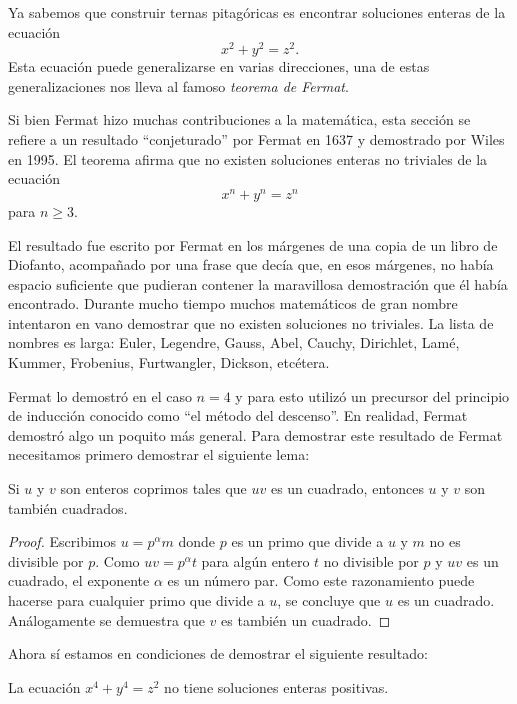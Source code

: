 Ya sabemos que construir ternas pitagóricas es encontrar
soluciones enteras de la ecuación 
\[
	x^2+y^2=z^2.
\]
Esta ecuación puede generalizarse en varias direcciones, una de estas
generalizaciones nos lleva al famoso \emph{teorema de Fermat}.  

Si bien Fermat
hizo muchas contribuciones a la matemática, esta sección se refiere a un
resultado ``conjeturado'' por Fermat en 1637 y demostrado por Wiles en 1995. El
teorema afirma que no existen soluciones enteras no triviales de la ecuación
\[
	x^n+y^n=z^n
\]
para $n\geq3$. 

El resultado fue escrito por Fermat en los márgenes de una copia de un libro de
Diofanto, acompañado por una frase que decía que, en esos márgenes, no había
espacio suficiente que pudieran contener la maravillosa demostración que él
había encontrado.  Durante mucho tiempo muchos matemáticos de gran nombre
intentaron en vano demostrar que no existen soluciones no triviales. La lista
de nombres es larga: Euler, Legendre, Gauss, Abel, Cauchy, Dirichlet, Lamé,
Kummer, Frobenius, Furtwangler, Dickson, etcétera.

Fermat lo demostró en el caso $n=4$ y para esto utilizó un precursor del
principio de inducción conocido como ``el método del descenso''. En realidad,
Fermat demostró algo un poquito más general. Para demostrar este resultado de
Fermat necesitamos primero demostrar el siguiente lema:

\begin{lemma}
	\label{lem:cuadrados}
	Si $u$ y $v$ son enteros coprimos tales que $uv$ es un cuadrado, entonces
	$u$ y $v$ son también cuadrados.
\end{lemma}

\begin{proof}
	Escribimos $u=p^{\alpha}m$ donde $p$ es un primo que divide a $u$ y $m$ no
	es divisible por $p$. Como $uv=p^{\alpha}t$ para algún entero $t$ no
	divisible por $p$ y $uv$ es un cuadrado, el exponente $\alpha$ es un número
	par. Como este razonamiento puede hacerse para cualquier primo que divide a
	$u$, se concluye que $u$ es un cuadrado. Análogamente se demuestra que $v$
	es también un cuadrado. 
\end{proof}

Ahora sí estamos en condiciones de demostrar el siguiente resultado:

\begin{theorem}
	La ecuación $x^4+y^4=z^2$ no tiene soluciones enteras positivas.
\end{theorem}

